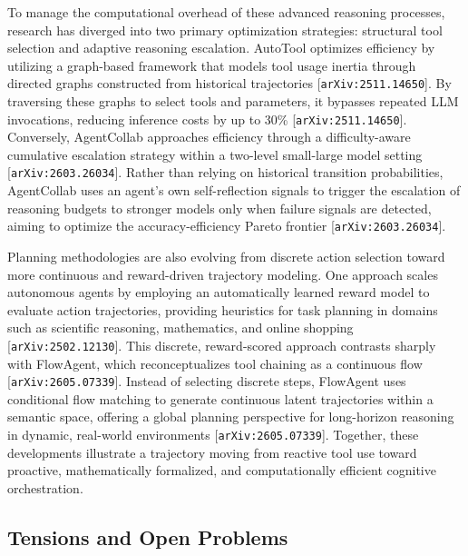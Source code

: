 \documentclass[11pt]{article}
\begin{document}
To manage the computational overhead of these advanced reasoning processes, research has diverged into two primary optimization strategies: structural tool selection and adaptive reasoning escalation. AutoTool optimizes efficiency by utilizing a graph-based framework that models tool usage inertia through directed graphs constructed from historical trajectories [\texttt{arXiv:2511.14650}]. By traversing these graphs to select tools and parameters, it bypasses repeated LLM invocations, reducing inference costs by up to 30\% [\texttt{arXiv:2511.14650}]. Conversely, AgentCollab approaches efficiency through a difficulty-aware cumulative escalation strategy within a two-level small-large model setting [\texttt{arXiv:2603.26034}]. Rather than relying on historical transition probabilities, AgentCollab uses an agent's own self-reflection signals to trigger the escalation of reasoning budgets to stronger models only when failure signals are detected, aiming to optimize the accuracy-efficiency Pareto frontier [\texttt{arXiv:2603.26034}].

Planning methodologies are also evolving from discrete action selection toward more continuous and reward-driven trajectory modeling. One approach scales autonomous agents by employing an automatically learned reward model to evaluate action trajectories, providing heuristics for task planning in domains such as scientific reasoning, mathematics, and online shopping [\texttt{arXiv:2502.12130}]. This discrete, reward-scored approach contrasts sharply with FlowAgent, which reconceptualizes tool chaining as a continuous flow [\texttt{arXiv:2605.07339}]. Instead of selecting discrete steps, FlowAgent uses conditional flow matching to generate continuous latent trajectories within a semantic space, offering a global planning perspective for long-horizon reasoning in dynamic, real-world environments [\texttt{arXiv:2605.07339}]. Together, these developments illustrate a trajectory moving from reactive tool use toward proactive, mathematically formalized, and computationally efficient cognitive orchestration.

\subsection{Tensions and Open Problems}
\end{document}
